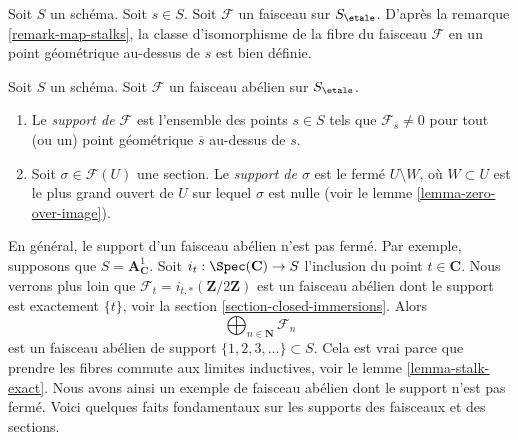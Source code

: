 \noindent
Soit $S$ un sch\'ema. Soit $s \in S$.
Soit $\mathcal{F}$ un faisceau sur $S_\etale$. D'apr\`es la
remarque \ref{remark-map-stalks},
la classe d'isomorphisme de la fibre du faisceau $\mathcal{F}$
en un point g\'eom\'etrique au-dessus de $s$ est bien d\'efinie.

\begin{definition}
\label{definition-support}
Soit $S$ un sch\'ema.
Soit $\mathcal{F}$ un faisceau ab\'elien sur $S_\etale$.
\begin{enumerate}
\item Le {\it support de $\mathcal{F}$} est l'ensemble des
points $s \in S$ tels que $\mathcal{F}_{\overline{s}} \not = 0$
pour tout (ou un) point g\'eom\'etrique $\overline{s}$ au-dessus de $s$.
\item Soit $\sigma \in \mathcal{F}(U)$ une section.
Le {\it support de $\sigma$} est le ferm\'e $U \setminus W$, o\`u
$W \subset U$ est le plus grand ouvert de $U$ sur lequel $\sigma$
est nulle (voir le
lemme \ref{lemma-zero-over-image}).
\end{enumerate}
\end{definition}

\noindent
En g\'en\'eral, le support d'un faisceau ab\'elien n'est pas ferm\'e.
Par exemple, supposons que $S = \mathbf{A}^1_{\mathbf{C}}$.
Soit $i_t : \Spec(\mathbf{C}) \to S$ l'inclusion du
point $t \in \mathbf{C}$.
Nous verrons plus loin que $\mathcal{F}_t = i_{t, *}(\mathbf{Z}/2\mathbf{Z})$
est un faisceau ab\'elien dont le support est exactement $\{t\}$, voir la
section \ref{section-closed-immersions}.
Alors
$$
\bigoplus\nolimits_{n \in \mathbf{N}} \mathcal{F}_n
$$
est un faisceau ab\'elien de support $\{1, 2, 3, \ldots\} \subset S$.
Cela est vrai parce que prendre les fibres commute aux limites inductives, voir le
lemme \ref{lemma-stalk-exact}.
Nous avons ainsi un exemple de faisceau ab\'elien dont le support n'est pas ferm\'e.
Voici quelques faits fondamentaux sur les supports des faisceaux et des sections.

